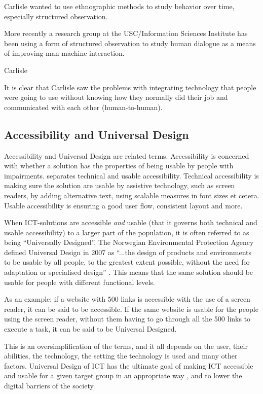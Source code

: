 Carlisle wanted to use ethnographic methods to study behavior over time, especially structured observation.

\begin{displayquote}
    More recently a research group at the USC/Information Sciences Institute has been using a form of structured observation to study human dialogue as a means of improving man-machine interaction.
\end{displayquote}

Carlisle

It is clear that Carlisle saw the problems with integrating technology that people were going to use without knowing how they normally did their job and communicated with each other (human-to-human). 


\subsection{Accessibility and Universal Design}
Accessibility and Universal Design are related terms. Accessibility is concerned with whether a solution has the properties of being usable by people with impairments. \textcite{paddison_applying_2003} separates technical and usable accessibility. Technical accessibility is making sure the solution are usable by assistive technology, such as screen readers, by adding alternative text, using scalable measures in font sizes et cetera. Usable accessibility is ensuring a good user flow, consistent layout and more.

When ICT-solutions are accessible \textit{and} usable (that it governs both technical and usable accessibility) to a larger part of the population, it is often referred to as being “Universally Designed”. The Norwegian Environmental Protection Agency defined Universal Design in 2007 as “...the design of products and environments to be usable by all people, to the greatest extent possible, without the need for adaptation or specialised design” \parencite{miljoverndepartementet_t-1468_2007}. This means that the same solution should be usable for people with different functional levels. 

As an example: if a website with 500 links is accessible with the use of a screen reader, it can be said to be accessible. If the same website is usable for the people using the screen reader, without them having to go through all the 500 links to execute a task, it can be said to be Universal Designed. 

This is an oversimplification of the terms, and it all depends on the user, their abilities, the technology, the setting the technology is used and many other factors. Universal Design of ICT has the ultimate goal of making ICT accessible and usable for a given target group in an appropriate way \parencite{tollefsen_web_2013}, and to lower the digital barriers of the society. 

